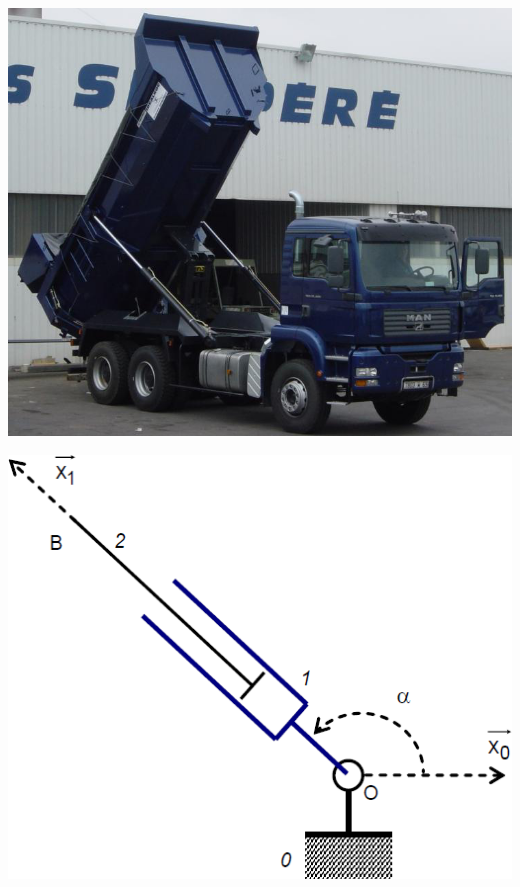 \documentclass[10pt,oneside]{article}
\begin{document}
\begin{minipage}[c]{.45\linewidth}
\begin{center}
\includegraphics[width=.9\textwidth]{png/benne1}
\end{center}
\end{minipage}\hfill
\begin{minipage}[c]{.45\linewidth}
\begin{center}
\includegraphics[width=.9\textwidth]{png/benne2}
\end{center}
\end{minipage}

\vspace{.25cm}
\end{document}
